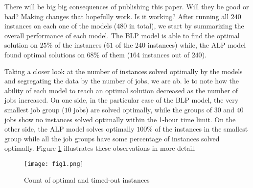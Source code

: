 There will be big big consequences of publishing this paper. Will they be good or bad?
Making changes that hopefully work.
Is it working?
After running all $240$ instances on each one of the models ($480$ in total), we start by summarizing the overall performance of each model. The BLP model is able to find the optimal solution on $25\%$ of the instances ($61$ of the $240$ instances) while, the ALP model found optimal solutions on $68\%$ of them ($164$ instances out of $240$).

Taking a closer look at the number of instances solved optimally by the models and segregating the data by the number of jobs, we are ab. le to note how the ability of each model to reach an optimal solution decreased as the number of jobs increased. On one side, in the particular case of the BLP model, the very smallest job group ($10$ jobs) are solved optimally, while the groups of $30$ and $40$ jobs show no instances solved optimally within the 1-hour time limit. On the other side, the ALP model solves optimally $100\%$ of the instances in the smallest group while all the job groups have some percentage of instances solved optimally. Figure \ref{fig:f1} illustrates these observations in more detail.
\begin{figure}[h!]
\caption{Count of optimal and timed-out instances}
\label{fig:f1}
\centering
\texttt{[image: fig1.png]}
\end{figure}

